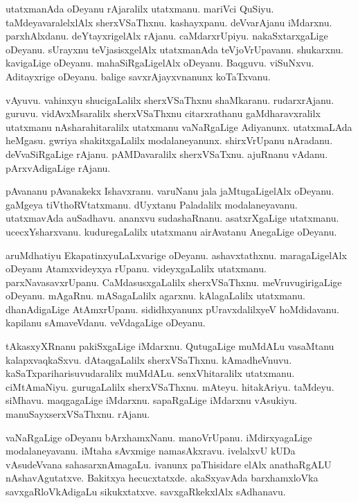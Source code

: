 \documentclass{article}
\begin{document}
\begin{mn}%
utatxmanAda oDeyanu rAjaralilx utatxmanu. mariVci QuSiyu. taMdeyavaralelxlAlx sherxVSaThxnu. 
kashayxpanu. deVvarAjanu iMdarxnu. parxhAlxdanu. deYtayxrigelAlx rAjanu. caMdarxrUpiyu. 
nakaSxtarxgaLige oDeyanu. sUrayxnu teVjasisxgelAlx utatxmanAda teVjoVrUpavanu. shukarxnu. 
kavigaLige oDeyanu. mahaSiRgaLigelAlx oDeyanu. Baqguvu. viSuNxvu. Aditayxrige oDeyanu. balige 
savxrAjayxvnanunx koTaTxvanu.
\end{mn}

\begin{mn}%
vAyuvu. vahinxyu shucigaLalilx sherxVSaThxnu shaMkaranu. rudarxrAjanu. guruvu. vidAvxMsaralilx 
sherxVSaThxnu citarxrathanu gaMdharavxralilx utatxmanu nAsharahitaralilx utatxmanu vaNaRgaLige 
Adiyanunx. utatxmaLAda heMgasu. gwriya shakitxgaLalilx modalaneyanunx. shirxVrUpanu nAradanu. 
deVvaSiRgaLige rAjanu. pAMDavaralilx sherxVSaTxnu. ajuRnanu vAdanu. pArxvAdigaLige rAjanu.
\end{mn}

\begin{mn}%
pAvananu pAvanakekx Ishavxranu. varuNanu jala jaMtugaLigelAlx oDeyanu. gaMgeya tiVthoRVtatxmanu. 
dUyxtanu Paladalilx modalaneyavanu. utatxmavAda auSadhavu. ananxvu sudashaRnanu. asatxrXgaLige 
utatxmanu. ucecxYsharxvanu. kuduregaLalilx utatxmanu airAvatanu AnegaLige oDeyanu.
\end{mn}

\begin{mn}%
aruMdhatiyu EkapatinxyuLaLxvarige oDeyanu. ashavxtathxnu. maragaLigelAlx oDeyanu Atamxvideyxya 
rUpanu. videyxgaLalilx utatxmanu. parxNavasavxrUpanu. CaMdasusxgaLalilx sherxVSaThxnu. 
meVruvugirigaLige oDeyanu. mAgaRnu. mASagaLalilx agarxnu. kAlagaLalilx utatxmanu. dhanAdigaLige 
AtAmxrUpanu. sididhxyanunx pUravxdalilxyeV hoMdidavanu. kapilanu sAmaveVdanu. veVdagaLige oDeyanu.
\end{mn}

\begin{mn}%
tAkasxyXRnanu pakiSxgaLige iMdarxnu. QutugaLige muMdALu vasaMtanu kalapxvaqkaSxvu. dAtaqgaLalilx 
sherxVSaThxnu. kAmadheVnuvu. kaSaTxpariharisuvudaralilx muMdALu. senxVhitaralilx utatxmanu. 
ciMtAmaNiyu. gurugaLalilx sherxVSaThxnu. mAteyu. hitakAriyu. taMdeyu. siMhavu. maqgagaLige 
iMdarxnu. sapaRgaLige iMdarxnu vAsukiyu. manuSayxserxVSaThxnu. rAjanu.
\end{mn}

\begin{mn}%
vaNaRgaLige oDeyanu bArxhamxNanu. manoVrUpanu. iMdirxyagaLige modalaneyavanu. iMtaha sAvxmige 
namasAkxravu. ivelalxvU kUDa vAsudeVvana sahasarxnAmagaLu. ivanunx paThisidare elAlx anathaRgALU 
nAshavAgutatxve. Bakitxya hecucxtatxde. akaSxyavAda barxhamxloVka savxgaRloVkAdigaLu sikukxtatxve. 
savxgaRkekxlAlx sAdhanavu.
\end{mn}
\end{document}
